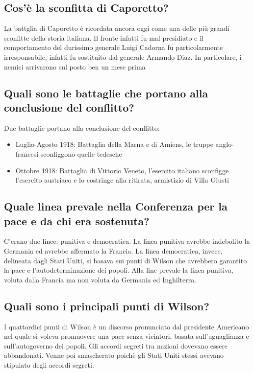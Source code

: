 \documentclass{article}
\begin{document}
\subsection{Cos'è la sconfitta di Caporetto?}
La battglia di Caporetto è ricordata ancora oggi come una delle più grandi sconfitte della storia italiana. Il fronte infatti
fu mal presidiato e il comportamento del durissimo generale Luigi Cadorna fu particolarmente irresponsabile, infatti fu
sostituito dal generale Armando Diaz. In particolare, i nemici arrivarono sul posto ben un mese prima

\subsection{Quali sono le battaglie che portano alla conclusione del conflitto?}
Due battaglie portano alla conclusione del conflitto:
\begin{itemize}
    \item Luglio-Agosto 1918: Battaglia della Marna e di Amiens, le truppe anglo-francesi sconfiggono quelle tedesche
    \item Ottobre 1918: Battaglia di Vittorio Veneto, l'esercito italiano sconfigge l'esercito austriaco e lo costringe
          alla ritirata, armistizio di Villa Giusti
\end{itemize}

\subsection{Quale linea prevale nella Conferenza per la pace e da chi era sostenuta?}
C'erano due linee: punitiva e democratica. La linea punitiva avrebbe indebolito la Germania ed avrebbe affermato la Francia.
La linea democratica, invece, delineata dagli Stati Uniti, si basava sui punti di Wilson che avrebbero garantito la pace e
l'autodeterminazione dei popoli. Alla fine prevale la linea punitiva, voluta dalla Francia ma non voluta da Germania ed
Inghilterra.

\subsection{Quali sono i principali punti di Wilson?}
I quattordici punti di Wilson è un discorso pronunciato dal presidente Americano nel quale si voleva promuovere una pace
senza vicintori, basata sull'uguaglianza e sull'autogoverno dei popoli. Gli accordi segreti tra nazioni dovevano essere
abbandonati. Venne poi smascherato poichè gli Stati Uniti stessi avevano stipulato degli accordi segreti.
\end{document}
